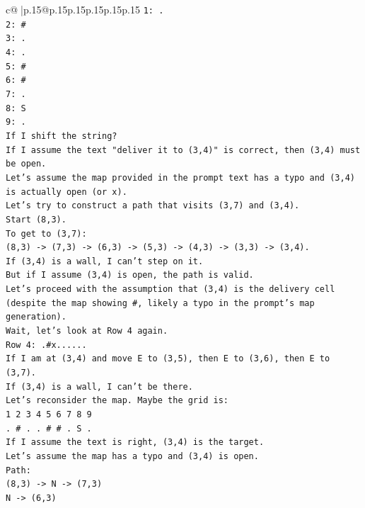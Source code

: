 \documentclass{article}
\begin{document}
{\begin{supertabular}{c@{$\;$}|p{.15\linewidth}@{}p{.15\linewidth}p{.15\linewidth}p{.15\linewidth}p{.15\linewidth}p{.15\linewidth}}
{{{\texttt{1: .} \\
\texttt{2: \#} \\
\texttt{3: .} \\
\texttt{4: .} \\
\texttt{5: \#} \\
\texttt{6: \#} \\
\texttt{7: .} \\
\texttt{8: S} \\
\texttt{9: .} \\
\texttt{If I shift the string?} \\
\texttt{If I assume the text "deliver it to (3,4)" is correct, then (3,4) must be open.} \\
\texttt{Let's assume the map provided in the prompt text has a typo and (3,4) is actually open (or x).} \\
\texttt{Let's try to construct a path that visits (3,7) and (3,4).} \\
\texttt{Start (8,3).} \\
\texttt{To get to (3,7):} \\
\texttt{(8,3) {-}> (7,3) {-}> (6,3) {-}> (5,3) {-}> (4,3) {-}> (3,3) {-}> (3,4).} \\
\texttt{If (3,4) is a wall, I can't step on it.} \\
\texttt{But if I assume (3,4) is open, the path is valid.} \\
\texttt{Let's proceed with the assumption that (3,4) is the delivery cell (despite the map showing \#, likely a typo in the prompt's map generation).} \\
\texttt{Wait, let's look at Row 4 again.} \\
\texttt{Row 4: .\#x......} \\
\texttt{If I am at (3,4) and move E to (3,5), then E to (3,6), then E to (3,7).} \\
\texttt{If (3,4) is a wall, I can't be there.} \\
\texttt{Let's reconsider the map. Maybe the grid is:} \\
\texttt{1 2 3 4 5 6 7 8 9} \\
\texttt{. \# . . \# \# . S .} \\
\texttt{If I assume the text is right, (3,4) is the target.} \\
\texttt{Let's assume the map has a typo and (3,4) is open.} \\
\texttt{Path:} \\
\texttt{(8,3) {-}> N {-}> (7,3)} \\
\texttt{N {-}> (6,3)} \\
}}}
\end{supertabular}}
\end{document}
